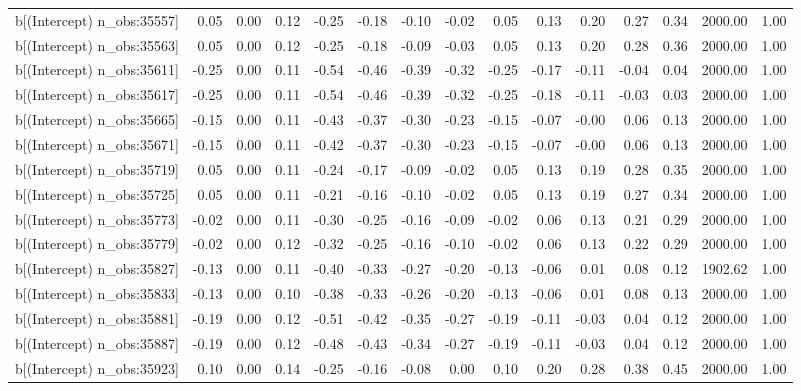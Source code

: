 \begin{table}[ht]
\begin{tabular}{rrrrrrrrrrrrrrr}
  b[(Intercept) n\_obs:35557] & 0.05 & 0.00 & 0.12 & -0.25 & -0.18 & -0.10 & -0.02 & 0.05 & 0.13 & 0.20 & 0.27 & 0.34 & 2000.00 & 1.00 \\ 
  b[(Intercept) n\_obs:35563] & 0.05 & 0.00 & 0.12 & -0.25 & -0.18 & -0.09 & -0.03 & 0.05 & 0.13 & 0.20 & 0.28 & 0.36 & 2000.00 & 1.00 \\ 
  b[(Intercept) n\_obs:35611] & -0.25 & 0.00 & 0.11 & -0.54 & -0.46 & -0.39 & -0.32 & -0.25 & -0.17 & -0.11 & -0.04 & 0.04 & 2000.00 & 1.00 \\ 
  b[(Intercept) n\_obs:35617] & -0.25 & 0.00 & 0.11 & -0.54 & -0.46 & -0.39 & -0.32 & -0.25 & -0.18 & -0.11 & -0.03 & 0.03 & 2000.00 & 1.00 \\ 
  b[(Intercept) n\_obs:35665] & -0.15 & 0.00 & 0.11 & -0.43 & -0.37 & -0.30 & -0.23 & -0.15 & -0.07 & -0.00 & 0.06 & 0.13 & 2000.00 & 1.00 \\ 
  b[(Intercept) n\_obs:35671] & -0.15 & 0.00 & 0.11 & -0.42 & -0.37 & -0.30 & -0.23 & -0.15 & -0.07 & -0.00 & 0.06 & 0.13 & 2000.00 & 1.00 \\ 
  b[(Intercept) n\_obs:35719] & 0.05 & 0.00 & 0.11 & -0.24 & -0.17 & -0.09 & -0.02 & 0.05 & 0.13 & 0.19 & 0.28 & 0.35 & 2000.00 & 1.00 \\ 
  b[(Intercept) n\_obs:35725] & 0.05 & 0.00 & 0.11 & -0.21 & -0.16 & -0.10 & -0.02 & 0.05 & 0.13 & 0.19 & 0.27 & 0.34 & 2000.00 & 1.00 \\ 
  b[(Intercept) n\_obs:35773] & -0.02 & 0.00 & 0.11 & -0.30 & -0.25 & -0.16 & -0.09 & -0.02 & 0.06 & 0.13 & 0.21 & 0.29 & 2000.00 & 1.00 \\ 
  b[(Intercept) n\_obs:35779] & -0.02 & 0.00 & 0.12 & -0.32 & -0.25 & -0.16 & -0.10 & -0.02 & 0.06 & 0.13 & 0.22 & 0.29 & 2000.00 & 1.00 \\ 
  b[(Intercept) n\_obs:35827] & -0.13 & 0.00 & 0.11 & -0.40 & -0.33 & -0.27 & -0.20 & -0.13 & -0.06 & 0.01 & 0.08 & 0.12 & 1902.62 & 1.00 \\ 
  b[(Intercept) n\_obs:35833] & -0.13 & 0.00 & 0.10 & -0.38 & -0.33 & -0.26 & -0.20 & -0.13 & -0.06 & 0.01 & 0.08 & 0.13 & 2000.00 & 1.00 \\ 
  b[(Intercept) n\_obs:35881] & -0.19 & 0.00 & 0.12 & -0.51 & -0.42 & -0.35 & -0.27 & -0.19 & -0.11 & -0.03 & 0.04 & 0.12 & 2000.00 & 1.00 \\ 
  b[(Intercept) n\_obs:35887] & -0.19 & 0.00 & 0.12 & -0.48 & -0.43 & -0.34 & -0.27 & -0.19 & -0.11 & -0.03 & 0.04 & 0.12 & 2000.00 & 1.00 \\ 
  b[(Intercept) n\_obs:35923] & 0.10 & 0.00 & 0.14 & -0.25 & -0.16 & -0.08 & 0.00 & 0.10 & 0.20 & 0.28 & 0.38 & 0.45 & 2000.00 & 1.00 \\ 

\end{tabular}
\end{table}
